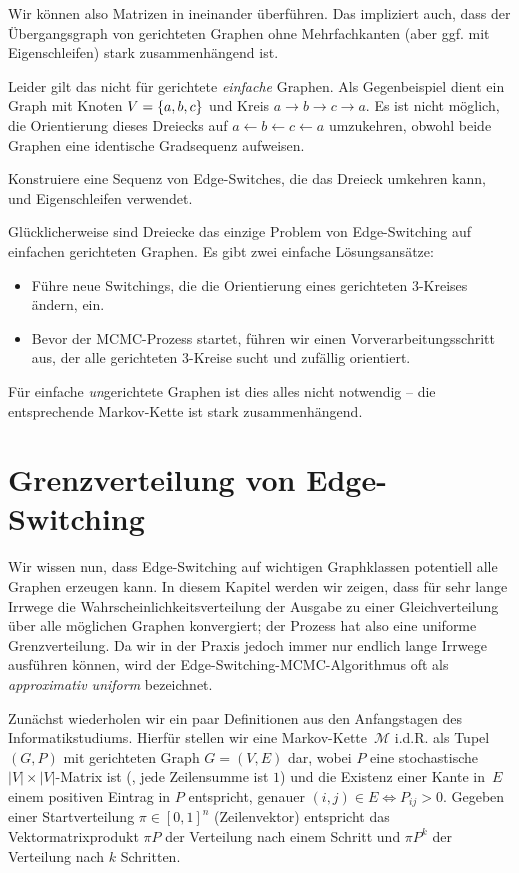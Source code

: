 Wir können also Matrizen in \msz ineinander überführen.
Das impliziert auch, dass der Übergangsgraph von gerichteten Graphen ohne Mehrfachkanten (aber ggf. mit Eigenschleifen) stark zusammenhängend ist.

Leider gilt das nicht für gerichtete \emph{einfache} Graphen.
Als Gegenbeispiel dient ein Graph mit Knoten $V = \left\{a,b,c\right\}$ und Kreis $a \to b \to c \to a$.
Es ist nicht möglich, die Orientierung dieses Dreiecks auf $a \leftarrow b \leftarrow c \leftarrow a$ umzukehren, obwohl beide Graphen eine identische Gradsequenz aufweisen.

\begin{exercise}
    Konstruiere eine Sequenz von Edge-Switches, die das Dreieck umkehren kann, und Eigenschleifen verwendet.
\end{exercise}

Glücklicherweise sind Dreiecke das einzige Problem von Edge-Switching auf einfachen gerichteten Graphen.
Es gibt zwei einfache Lösungsansätze:
\begin{itemize}
    \item Führe neue Switchings, die die Orientierung eines gerichteten 3-Kreises ändern, ein.
    \item Bevor der MCMC-Prozess startet, führen wir einen Vorverarbeitungsschritt aus, der alle gerichteten 3-Kreise sucht und zufällig orientiert.
\end{itemize}

Für einfache \emph{un}gerichtete Graphen ist dies alles nicht notwendig -- die entsprechende Markov-Kette ist stark zusammenhängend.

\section{Grenzverteilung von Edge-Switching}
Wir wissen nun, dass Edge-Switching auf wichtigen Graphklassen potentiell alle Graphen erzeugen kann.
In diesem Kapitel werden wir zeigen, dass für sehr lange Irrwege die Wahrscheinlichkeitsverteilung der Ausgabe zu einer Gleichverteilung über alle möglichen Graphen konvergiert;
der Prozess hat also eine uniforme Grenzverteilung.
Da wir in der Praxis jedoch immer nur endlich lange Irrwege ausführen können, wird der Edge-Switching-MCMC-Algorithmus oft als \emph{approximativ uniform} bezeichnet.

Zunächst wiederholen wir ein paar Definitionen aus den Anfangstagen des Informatikstudiums.
Hierfür stellen wir eine Markov-Kette~$\mathcal M$ i.d.R. als Tupel $(G, P)$ mit gerichteten Graph $G = (V, E)$ dar, wobei $P$ eine stochastische $|V| \times |V|$-Matrix ist (\dh, jede Zeilensumme ist $1$) und die Existenz einer Kante in~$E$ einem positiven Eintrag in $P$ entspricht, genauer $(i, j) \in E \Leftrightarrow P_{ij} > 0$.
Gegeben einer Startverteilung $\pi \in [0, 1]^n$ (Zeilenvektor) entspricht das Vektormatrixprodukt $\pi P$ der Verteilung nach einem Schritt und $\pi P^k$ der Verteilung nach $k$ Schritten.

